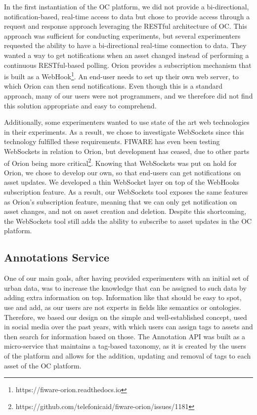 In the first instantiation of the OC platform, we did not provide a bi-directional, notification-based, real-time access to data but chose to provide access through a request and response approach leveraging the RESTful architecture of OC. This approach was sufficient for conducting experiments, but several experimenters requested the ability to have a bi-directional real-time connection to data. They wanted a way to get notifications when an asset changed instead of performing a continuous RESTful-based polling. Orion provides a subscription mechanism that is built as a WebHook\footnote{https://fiware-orion.readthedocs.io}. An end-user needs to set up their own web server, to which Orion can then send notifications. Even though this is a standard approach, many of our users were not programmers, and we therefore did not find this solution appropriate and easy to comprehend.

Additionally, some experimenters wanted to use state of the art web technologies in their experiments. As a result, we chose to investigate WebSockets since this technology fulfilled these requirements. FIWARE has even been testing WebSockets in relation to Orion, but development has ceased, due to other parts of Orion being more critical\footnote{https://github.com/telefonicaid/fiware-orion/issues/1181}. Knowing that WebSockets was put on hold for Orion, we chose to develop our own, so that end-users can get notifications on asset updates. We developed a thin WebSocket layer on top of the WebHooks subscription feature. As a result, our WebSockets tool exposes the same features as Orion's subscription feature, meaning that we can only get notification on asset changes, and not on asset creation and deletion. Despite this shortcoming, the WebSockets tool still adds the ability to subscribe to asset updates in the OC platform.

\subsection{Annotations Service}
\label{sec:annotation-service}

One of our main goals, after having provided experimenters with an initial set of urban data, was to increase the knowledge that can be assigned to such data by adding extra information on top. Information like that should be easy to spot, use and add, as our users are not experts in fields like semantics or ontologies. Therefore, we based our design on the simple and well-established concept, used in social media over the past years, with which users can assign tags to assets and then search for information based on those. The Annotation API was built as a micro-service that maintains a tag-based taxonomy, as it is created by the users of the platform and allows for the addition, updating and removal of tags to each asset of the OC platform.


